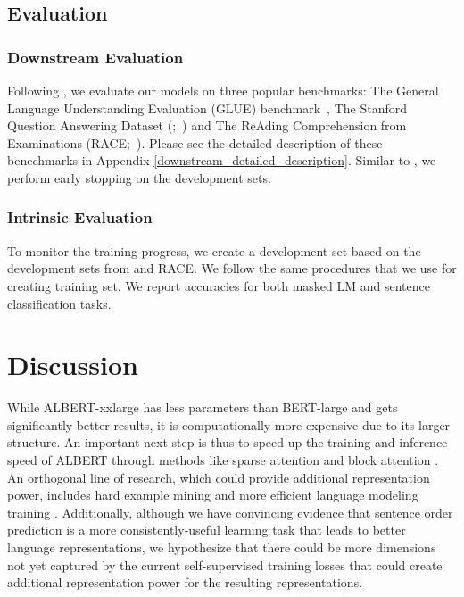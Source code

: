 \subsection{Evaluation}

\subsubsection{Downstream Evaluation}

Following \citep{yang2019xlnet,liu2019roberta}, we evaluate our models on three popular benchmarks: The General Language Understanding Evaluation (GLUE) benchmark~\citep{wang-etal-2018-glue}, The Stanford Question Answering Dataset (\squad;~\citealp{rajpurkar-etal-2016-squad,rajpurkar-etal-2018-know}) and The ReAding Comprehension from Examinations (RACE;~\citealp{lai2017race}). Please see the detailed description of these benechmarks in Appendix \ref{downstream_detailed_description}. Similar to \cite{liu2019roberta}, we perform early stopping on the development sets.

\subsubsection{Intrinsic Evaluation}

To monitor the training progress, we create a development set based on the development sets from \squad and RACE. We follow the same procedures that we use for creating training set. We report accuracies for both masked LM and sentence classification tasks. 


\section{Discussion}


While ALBERT-xxlarge has less parameters than BERT-large and gets significantly better results, it is computationally more expensive due to its larger structure. An important next step is thus to speed up the training and inference speed of ALBERT through methods like sparse attention \citep{child2019generating} and block attention \citep{shen2018bi}.
An orthogonal line of research, which could provide additional representation power, includes hard example mining \citep{mikolov2013distributed} and more efficient language modeling training \citep{yang2019xlnet}.
Additionally, although we have convincing evidence that sentence order prediction is a more consistently-useful learning task that leads to better language representations, we hypothesize that there could be more dimensions not yet captured by the current self-supervised training losses that could create additional representation power for the resulting representations.

